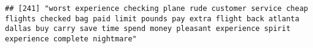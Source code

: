 \documentclass[
]{article}
\begin{document}
\begin{verbatim}
## [241] "worst experience checking plane rude customer service cheap flights checked bag paid limit pounds pay extra flight back atlanta dallas buy carry save time spend money pleasant experience spirit experience complete nightmare"                                                                                                                                                                                                                                                                                                                                                                                                                                                                                                                                                                                                                                                                                                                                                                                                                                                                                                                                                                                                                                                                                                                                                                                                                                                                                                                                                                                                                                                                                                                                                               

\end{verbatim}
\end{document}

